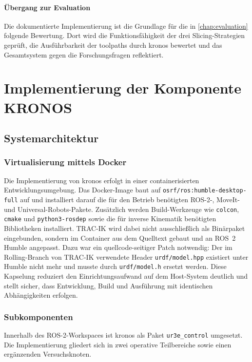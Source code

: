             \paragraph{Übergang zur Evaluation}\label{para:impl-medusa-summary-transition}
                Die dokumentierte Implementierung ist die Grundlage für die in \cref{chap:evaluation} folgende Bewertung.
                Dort wird die Funktionsfähigkeit der drei Slicing-Strategien geprüft, die Ausführbarkeit der \glspl{toolpath} durch \ac{kronos} bewertet und das Gesamtsystem gegen die Forschungsfragen reflektiert.

    \section{Implementierung der Komponente KRONOS}\label{sec:implementation-of-component-kronos}
        \subsection{Systemarchitektur}\label{subsec:kronos-system-architecture}
            \subsubsection{Virtualisierung mittels Docker}
            Die Implementierung von \ac{kronos} erfolgt in einer containerisierten Entwicklungsumgebung.
            Das Docker-Image baut auf \texttt{osrf/ros:humble-desktop-full} auf und installiert darauf die für den Betrieb benötigten ROS-2-, MoveIt- und Universal-Robots-Pakete.
            Zusätzlich werden Build-Werkzeuge wie \texttt{colcon}, \texttt{cmake} und \texttt{python3-rosdep} sowie die für inverse Kinematik benötigten Bibliotheken installiert.
            TRAC-IK wird dabei nicht ausschließlich als Binärpaket eingebunden, sondern im Container aus dem Quelltext gebaut und an ROS~2 Humble angepasst.
            Dazu war ein quellcode-seitiger Patch notwendig: Der im Rolling-Branch von TRAC-IK verwendete Header \texttt{urdf/model.hpp} existiert unter Humble nicht mehr und musste durch \texttt{urdf/model.h} ersetzt werden.
            Diese Kapselung reduziert den Einrichtungsaufwand auf dem Host-System deutlich und stellt sicher,
            dass Entwicklung, Build und Ausführung mit identischen Abhängigkeiten erfolgen.

            \subsubsection{Subkomponenten}
            Innerhalb des ROS-2-Workspaces ist \ac{kronos} als Paket \texttt{ur3e\_control} umgesetzt.
            Die Implementierung gliedert sich in zwei operative Teilbereiche sowie einen ergänzenden Versuchsknoten.

